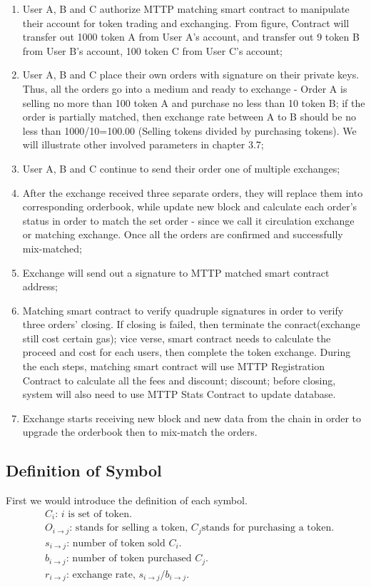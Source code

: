 \documentclass[UTF8,nofonts]{article}
\begin{document}
\begin{enumerate}
 \item User A,  B and C authorize MTTP matching smart contract to manipulate their account for token trading and exchanging. From figure,  Contract will transfer out 1000 token A from User A’s account,  and transfer out 9 token B from User B’s account,  100 token C from User C’s account;
 \item User A,  B and C place their own orders with signature on their private keys. Thus,  all the orders go into a medium and ready to exchange - Order A is selling no more than 100 token A and purchase no less than 10 token B; if the order is partially matched,  then exchange rate between A to B should be no less than 1000/10=100.00 (Selling tokens divided by purchasing tokens). We will illustrate other involved parameters in chapter 3.7;
 \item User A,  B and C continue to send their order one of multiple exchanges;
 \item After the exchange received three separate orders,  they will replace them into corresponding orderbook, while update new block and calculate each order’s status in order to match the set order - since we call it circulation exchange or matching exchange. Once all the orders are confirmed and successfully mix-matched;
 \item Exchange will send out a signature to MTTP matched smart contract address;
 \item Matching smart contract to verify quadruple signatures in order to verify three orders’ closing. If closing is failed,  then terminate the conract(exchange still cost certain gas); vice verse,  smart contract needs to calculate the proceed and cost for each users, then complete the token exchange. During the each steps, matching smart contract will use MTTP Registration Contract to calculate all the fees and discount; discount; before closing,  system will also need to use MTTP Stats Contract to update database.
 \item Exchange starts receiving new block and new data from the chain in order to upgrade the orderbook then to mix-match the orders.
\end{enumerate}


\subsection{Definition of Symbol}

First we would introduce the definition of each symbol.
\[
\begin{split}
&C_{i}\text{: \ }\text{$i$ is set of token.}\\
&O_{i\rightarrow j}\text{: \ }\text{stands for selling a token, $C_{j}$stands for purchasing a token.}\\
&s_{i\rightarrow j}\text{: \ }\text{number of token sold $C_{i}$.}\\
&b_{i\rightarrow j}\text{: \ }\text{number of token purchased $C_{j}$.}\\
&r_{i\rightarrow j}\text{: \ }\text{exchange rate,  $s_{i\rightarrow j} / b_{i\rightarrow j}$.}
\end{split}
\]
\end{document}
